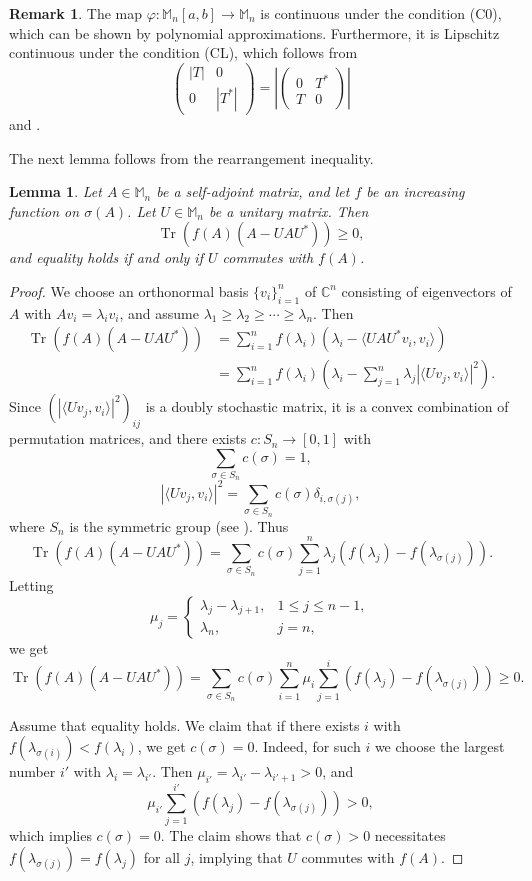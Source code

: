 \documentclass[12pt]{article}
\newtheorem{lemma}[theorem]{Lemma}
\theoremstyle{definition}
\newtheorem{remark}[theorem]{Remark}
\numberwithin{equation}{section}
\newcommand{\C}{\mathbb{C}}
\newcommand{\M}{\mathbb{M}}
\DeclareMathOperator{\Tr}{Tr}
\newcommand{\inpr}[2]{\langle{#1,#2}\rangle}
\begin{document}
\begin{remark}
The map $\varphi:\M_n[a,b]\to \M_n$ is continuous under the condition (C0), which can be  
shown by polynomial approximations.  
Furthermore, it is Lipschitz continuous under the condition (CL), which follows from 
\[
\left(
\begin{array}{cc}
|T| & 0 \\
0 &|T^*| 
\end{array}
\right)=
\left|
\left(
\begin{array}{cc}
0 &T^*  \\
T &0 
\end{array}
\right)
\right|\]
and \cite[Theorem 3.5.1]{AP2016}. 
\end{remark}

The next lemma follows from the rearrangement inequality. 

\begin{lemma}\label{rearrangement}
Let $A\in \M_n$ be a self-adjoint matrix, and let $f$ be an increasing function on $\sigma(A)$. 
Let $U\in \M_n$ be a unitary matrix. 
Then 
\[\Tr(f(A)(A-UAU^*))\geq 0,\]
and equality holds if and only if $U$ commutes with $f(A)$. 	
\end{lemma}

\begin{proof}
We choose an orthonormal basis $\{v_i\}_{i=1}^n$ of $\C^n$ consisting of eigenvectors of $A$ 
with $Av_i=\lambda_i v_i$, and assume $\lambda_1\geq \lambda_2\geq\cdots \geq \lambda_n$.  
Then 
\begin{align*}
\Tr(f(A)(A-UAU^*)) &=\sum_{i=1}^n f(\lambda_i)(\lambda_i-\inpr{UAU^*v_i}{v_i}) \\
	&=\sum_{i=1}^n f(\lambda_i)(\lambda_i-\sum_{j=1}^n\lambda_j|\inpr{Uv_j}{v_i}|^2).
\end{align*}
Since  $(|\inpr{Uv_j}{v_i}|^2)_{ij}$ is a doubly stochastic matrix, it is a convex combination 
of permutation matrices, and there exists $c:S_n\to [0,1]$ with 
\[\sum_{\sigma\in S_n}c(\sigma)=1,\]
\[|\inpr{Uv_j}{v_i}|^2=\sum_{\sigma\in S_n}c(\sigma)\delta_{i,\sigma(j)},\]
where $S_n$ is the symmetric group (see \cite[Theorem II.2.3]{B1997}). 
Thus 
\[\Tr(f(A)(A-UAU^*))=\sum_{\sigma\in S_n}c(\sigma)
\sum_{j=1}^n \lambda_j(f(\lambda_j)-f(\lambda_{\sigma(j)})).\] 
Letting 
\[\mu_j=\begin{cases}
	\lambda_j-\lambda_{j+1},  & 1\leq j\leq n-1, \\
	\lambda_n, &j=n,
\end{cases}\]
we get 
\[\Tr(f(A)(A-UAU^*))=\sum_{\sigma\in S_n}c(\sigma)\sum_{i=1}^n 
\mu_i\sum_{j=1}^i(f(\lambda_j)-f(\lambda_{\sigma(j)}))\geq 0.\]

Assume that equality holds. 
We claim that if there exists $i$ with $f(\lambda_{\sigma(i)})<f(\lambda_i)$, we get $c(\sigma)=0$. 
Indeed, for such $i$ we choose the largest number $i'$ with $\lambda_i=\lambda_{i'}$. 
Then $\mu_{i'}=\lambda_{i'}-\lambda_{i'+1}>0$, and 
\[\mu_{i'}\sum_{j=1}^{i'}(f(\lambda_j)-f(\lambda_{\sigma(j)}))>0,\]
which implies $c(\sigma)=0$. 
The claim shows that $c(\sigma)>0$ necessitates $f(\lambda_{\sigma(j)})=f(\lambda_j)$ for all $j$, 
implying that $U$ commutes with $f(A)$. 
\end{proof}
\end{document}
